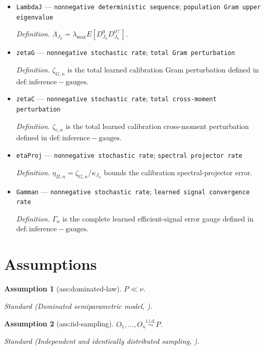 \documentclass{article}
\newtheorem{assumption}{Assumption}
\begin{document}
\begin{itemize}
  \par\smallskip\noindent\emph{Definition.} \(d_{0,n}\) bounds the \(L^2(P)\) error of the learned base contrast.
  \item \texttt{LambdaJ} --- \texttt{nonnegative deterministic sequence}; \texttt{population Gram upper eigenvalue}
  \par\smallskip\noindent\emph{Definition.} \(\Lambda_{J_n}=\lambda_{\max}E[D^0_{J_n}D_{J_n}^{0\top}]\).
  \item \texttt{zetaG} --- \texttt{nonnegative stochastic rate}; \texttt{total Gram perturbation}
  \par\smallskip\noindent\emph{Definition.} \(\zeta_{G,n}\) is the total learned calibration Gram perturbation defined in \(\mathrm{def:inference-gauges}\).
  \item \texttt{zetaC} --- \texttt{nonnegative stochastic rate}; \texttt{total cross-\allowbreak{}moment perturbation}
  \par\smallskip\noindent\emph{Definition.} \(\zeta_{c,n}\) is the total learned calibration cross-moment perturbation defined in \(\mathrm{def:inference-gauges}\).
  \item \texttt{etaProj} --- \texttt{nonnegative stochastic rate}; \texttt{spectral projector rate}
  \par\smallskip\noindent\emph{Definition.} \(\eta_{\Pi,n}=\zeta_{G,n}/\kappa_{J_n}\) bounds the calibration spectral-projector error.
  \item \texttt{Gamman} --- \texttt{nonnegative stochastic rate}; \texttt{learned signal convergence rate}
  \par\smallskip\noindent\emph{Definition.} \(\Gamma_n\) is the complete learned efficient-signal error gauge defined in \(\mathrm{def:inference-gauges}\).
\end{itemize}

\section{Assumptions}

\begin{assumption}[ass:dominated-law]\label{ass:dominated-law}
\(P\ll\nu\).
\par\smallskip\noindent\emph{Standard} (Dominated semiparametric model, \cite{vanDerVaart1998Asymptotic}).
\end{assumption}

\begin{assumption}[ass:iid-sampling]\label{ass:iid-sampling}
\(O_1,\ldots,O_n\stackrel{\mathrm{i.i.d.}}{\sim}P\).
\par\smallskip\noindent\emph{Standard} (Independent and identically distributed sampling, \cite{vanDerVaart1998Asymptotic}).
\end{assumption}
\end{document}
